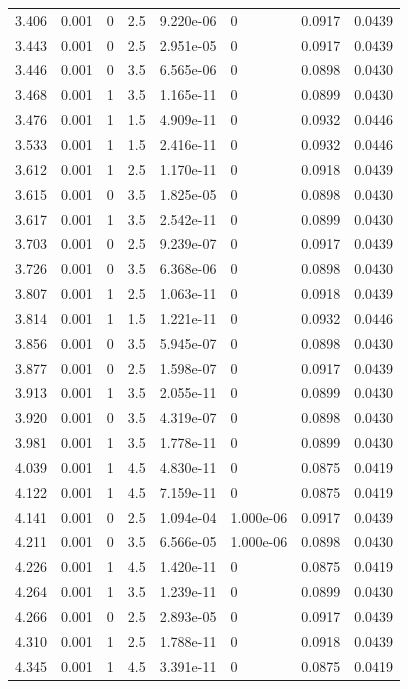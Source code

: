 \documentclass[preview]{standalone}
\begin{document}
{{{\begin{tabular}{L{1.2cm}C{1.2cm} C{0.3cm}C{0.5cm} C{1.4cm}C{1.4cm} C{1.4cm}C{1.4cm}}
  3.406  &  0.001  & 0     & 2.5 &  9.220e-06  & 0  & 0.0917 &  0.0439   \\ 
  3.443  &  0.001  & 0     & 2.5 &  2.951e-05  & 0  & 0.0917 &  0.0439   \\ 
  3.446  &  0.001  & 0     & 3.5 &  6.565e-06  & 0  & 0.0898 &  0.0430   \\ 
  3.468  &  0.001  & 1     & 3.5 &  1.165e-11  & 0  & 0.0899 &  0.0430   \\ 
  3.476  &  0.001  & 1     & 1.5 &  4.909e-11  & 0  & 0.0932 &  0.0446   \\ 
  3.533  &  0.001  & 1     & 1.5 &  2.416e-11  & 0  & 0.0932 &  0.0446   \\ 
  3.612  &  0.001  & 1     & 2.5 &  1.170e-11  & 0  & 0.0918 &  0.0439   \\ 
  3.615  &  0.001  & 0     & 3.5 &  1.825e-05  & 0  & 0.0898 &  0.0430   \\ 
  3.617  &  0.001  & 1     & 3.5 &  2.542e-11  & 0  & 0.0899 &  0.0430   \\ 
  3.703  &  0.001  & 0     & 2.5 &  9.239e-07  & 0  & 0.0917 &  0.0439   \\ 
  3.726  &  0.001  & 0     & 3.5 &  6.368e-06  & 0  & 0.0898 &  0.0430   \\ 
  3.807  &  0.001  & 1     & 2.5 &  1.063e-11  & 0  & 0.0918 &  0.0439   \\ 
  3.814  &  0.001  & 1     & 1.5 &  1.221e-11  & 0  & 0.0932 &  0.0446   \\ 
  3.856  &  0.001  & 0     & 3.5 &  5.945e-07  & 0  & 0.0898 &  0.0430   \\ 
  3.877  &  0.001  & 0     & 2.5 &  1.598e-07  & 0  & 0.0917 &  0.0439   \\ 
  3.913  &  0.001  & 1     & 3.5 &  2.055e-11  & 0  & 0.0899 &  0.0430   \\ 
  3.920  &  0.001  & 0     & 3.5 &  4.319e-07  & 0  & 0.0898 &  0.0430   \\ 
  3.981  &  0.001  & 1     & 3.5 &  1.778e-11  & 0  & 0.0899 &  0.0430   \\ 
  4.039  &  0.001  & 1     & 4.5 &  4.830e-11  & 0  & 0.0875 &  0.0419   \\ 
  4.122  &  0.001  & 1     & 4.5 &  7.159e-11  & 0  & 0.0875 &  0.0419   \\ 
  4.141  &  0.001  & 0     & 2.5 &  1.094e-04  & 1.000e-06  & 0.0917 &  0.0439   \\ 
  4.211  &  0.001  & 0     & 3.5 &  6.566e-05  & 1.000e-06  & 0.0898 &  0.0430   \\ 
  4.226  &  0.001  & 1     & 4.5 &  1.420e-11  & 0  & 0.0875 &  0.0419   \\ 
  4.264  &  0.001  & 1     & 3.5 &  1.239e-11  & 0  & 0.0899 &  0.0430   \\ 
  4.266  &  0.001  & 0     & 2.5 &  2.893e-05  & 0  & 0.0917 &  0.0439   \\ 
  4.310  &  0.001  & 1     & 2.5 &  1.788e-11  & 0  & 0.0918 &  0.0439   \\ 
  4.345  &  0.001  & 1     & 4.5 &  3.391e-11  & 0  & 0.0875 &  0.0419   \\ 
\hline 
\end{tabular} 

}}}
\end{document}
